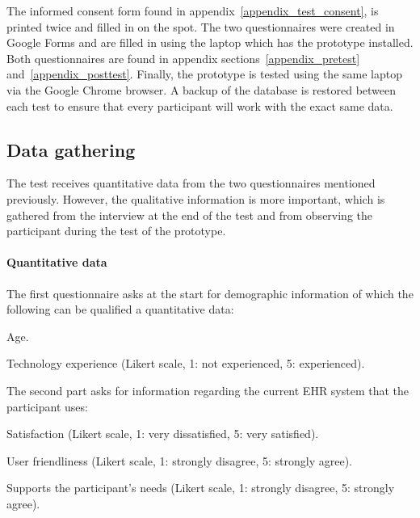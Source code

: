     \noindent The informed consent form found in appendix~\ref{appendix_test_consent}, is printed twice and filled in on the spot. The two questionnaires were created in Google Forms and are filled in using the laptop which has the prototype installed. Both questionnaires are found in appendix sections~\ref{appendix_pretest} and~\ref{appendix_posttest}. Finally, the prototype is tested using the same laptop via the Google Chrome browser. A backup of the database is restored between each test to ensure that every participant will work with the exact same data.

    \subsection{Data gathering}

    The test receives quantitative data from the two questionnaires mentioned previously. However, the qualitative information is more important, which is gathered from the interview at the end of the test and from observing the participant during the test of the prototype.

    \paragraph{Quantitative data} The first questionnaire asks at the start for demographic information of which the following can be qualified a quantitative data: 
    \vspace{-6pt}
    \begin{myitemize}
        \item Age.
        \item Technology experience (Likert scale, 1: not experienced, 5: experienced).
    \end{myitemize}
    \noindent The second part asks for information regarding the current EHR system that the participant uses: 
    \vspace{-6pt}
    \begin{myitemize}
        \item Satisfaction (Likert scale, 1: very dissatisfied, 5: very satisfied).
        \item User friendliness (Likert scale, 1: strongly disagree, 5: strongly agree).
        \item Supports the participant's needs (Likert scale, 1: strongly disagree, 5: strongly agree).
    \end{myitemize}

